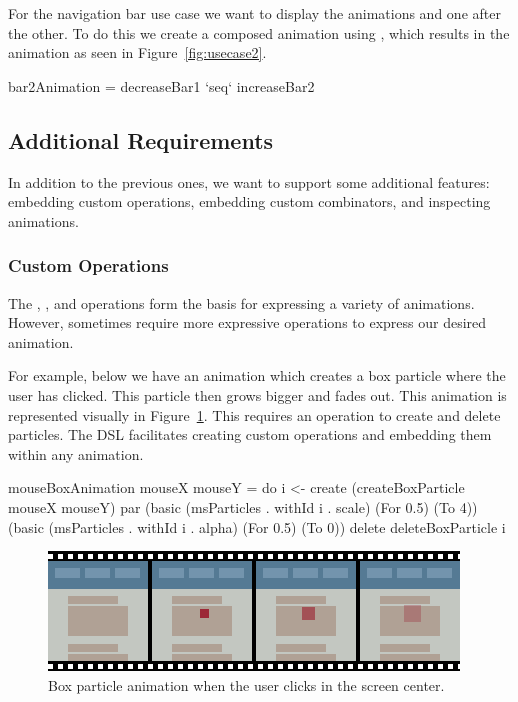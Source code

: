 For the navigation bar use case we want to display the animations  and  one after the other. To do this we create a composed animation using , which results in the animation as seen in Figure~\ref{fig:usecase2}.

\begin{spec}
bar2Animation = decreaseBar1 `seq` increaseBar2
\end{spec}

\subsection{Additional Requirements}

In addition to the previous ones, we want to support some additional features: embedding custom operations, embedding custom combinators, and inspecting animations.

\subsubsection{Custom Operations}
\label{sec:customop}

The , , and  operations form the basis for expressing a variety of animations. However, sometimes require more expressive operations to express our desired animation.

For example, below we have an animation which creates a box particle where the user has clicked. This particle then grows bigger and fades out. This animation is represented visually in Figure~\ref{fig:usecase3}. This requires an operation to create and delete particles. The DSL facilitates creating custom operations and embedding them within any animation.

\begin{spec}
mouseBoxAnimation mouseX mouseY = do
  i <- create (createBoxParticle mouseX mouseY)
  par (basic (msParticles . withId i . scale) (For 0.5) (To 4))
      (basic (msParticles . withId i . alpha) (For 0.5) (To 0))
  delete deleteBoxParticle i
\end{spec}

\begin{figure}[h]
\centering
\includegraphics[width=\figscale\textwidth]{pictures/usecase3fig}
\caption{Box particle animation when the user clicks in the screen center.}
\label{fig:usecase3}
\end{figure}

